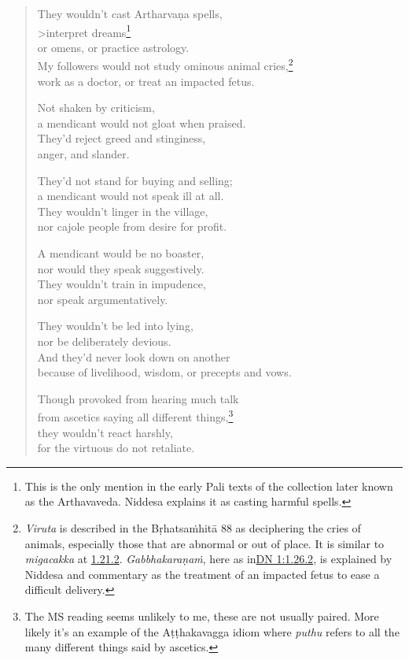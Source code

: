 \documentclass[12pt,openany]{book}%
\begin{document}
\begin{verse}
They wouldn’t cast \textsanskrit{Artharvaṇa} spells, \\>interpret dreams\footnote{This is the only mention in the early Pali texts of the collection later known as the Arthavaveda. Niddesa explains it as casting harmful spells. } \\
or omens, or practice astrology. \\
My followers would not study ominous animal cries,\footnote{\textit{Viruta} is described in the \textsanskrit{Bṛhatsaṁhitā} 88 as deciphering the cries of animals, especially those that are abnormal or out of place. It is similar to \textit{migacakka} at \href{https://suttacentral.net/1.21.2/en/sujato}{1.21.2}. \textit{\textsanskrit{Gabbhakaraṇaṁ}}, here as in\href{https://suttacentral.net/dn1/en/sujato\#1.26.2}{DN 1:1.26.2}, is explained by Niddesa and commentary as the treatment of an impacted fetus to ease a difficult delivery. } \\
work as a doctor, or treat an impacted fetus. 

Not shaken by criticism, \\
a mendicant would not gloat when praised. \\
They’d reject greed and stinginess, \\
anger, and slander. 

They’d not stand for buying and selling; \\
a mendicant would not speak ill at all. \\
They wouldn’t linger in the village, \\
nor cajole people from desire for profit. 

A mendicant would be no boaster, \\
nor would they speak suggestively. \\
They wouldn’t train in impudence, \\
nor speak argumentatively. 

They wouldn’t be led into lying, \\
nor be deliberately devious. \\
And they’d never look down on another \\
because of livelihood, wisdom, or precepts and vows. 

Though provoked from hearing much talk \\
from ascetics saying all different things,\footnote{The MS reading seems unlikely to me, these are not usually paired. More likely it’s an example of the \textsanskrit{Aṭṭhakavagga} idiom where \textit{puthu} refers to all the many different things said by ascetics. } \\
they wouldn’t react harshly, \\
for the virtuous do not retaliate. 


\end{verse}
\end{document}
